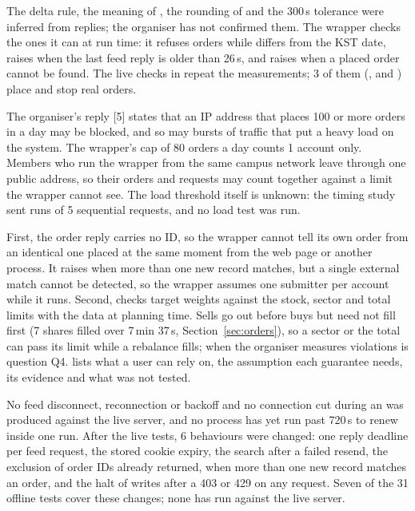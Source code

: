  The delta rule, the meaning of , the rounding of  and the 300\,s tolerance were inferred from replies; the organiser has not confirmed them. The wrapper checks the ones it can at run time: it refuses orders while  differs from the KST date, raises  when the last feed reply is older than 26\,s, and raises  when a placed order cannot be found. The live checks in  repeat the measurements; 3 of them (,  and ) place and stop real orders.

 The organiser's reply [5] states that an IP address that places 100 or more orders in a day may be blocked, and so may bursts of traffic that put a heavy load on the system. The wrapper's cap of 80 orders a day counts 1 account only. Members who run the wrapper from the same campus network leave through one public address, so their orders and requests may count together against a limit the wrapper cannot see. The load threshold itself is unknown: the timing study sent runs of 5 sequential requests, and no load test was run.

 First, the order reply carries no ID, so the wrapper cannot tell its own order from an identical one placed at the same moment from the web page or another process. It raises  when more than one new record matches, but a single external match cannot be detected, so the wrapper assumes one submitter per account while it runs. Second,  checks target weights against the stock, sector and total limits with the data at planning time. Sells go out before buys but need not fill first (7 shares filled over 7\,min 37\,s, Section~\ref{sec:orders}), so a sector or the total can pass its limit while a rebalance fills; when the organiser measures violations is question Q4.  lists what a user can rely on, the assumption each guarantee needs, its evidence and what was not tested.

 No feed disconnect, reconnection or backoff and no connection cut during an  was produced against the live server, and no process has yet run past 720\,s to renew inside one run. After the live tests, 6 behaviours were changed: one reply deadline per feed request, the stored cookie expiry, the search after a failed resend, the exclusion of order IDs already returned,  when more than one new record matches an order, and the halt of writes after a 403 or 429 on any request. Seven of the 31 offline tests cover these changes; none has run against the live server.

